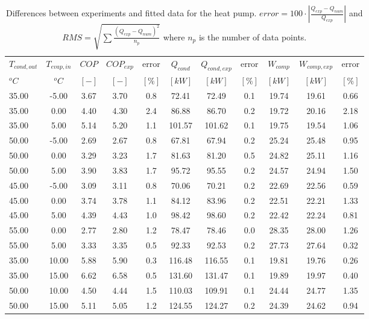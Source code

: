 \documentclass[english]{SPFShortReport}
\begin{document}
\begin{table}[!ht]
\begin{small}
\caption{Differences between experiments and fitted data for the heat pump.          $error=100 \cdot |\frac{Q_{exp}-Q_{num}}{Q_{exp}}|$ and $RMS = \sqrt { \sum{\frac{(Q_{exp}-Q_{num})^2}{n_p}} }$ where $n_p$ is the number of data points.}
\begin{center}
\resizebox{12cm}{!} 
{
\begin{tabular}{l | c c c c c c c c c c } 
\hline
\hline
$T_{cond,out}$ &$T_{evap,in}$ &$COP$ &$COP_{exp}$ &error &$Q_{cond}$ &$Q_{cond,exp}$ &error &$W_{comp}$ &$W_{comp,exp}$ &error \\ 
$^oC$ &$^oC$ &$[-]$ &$[-]$ &$[\%]$ &$[kW]$ &$[kW]$ &$[\%]$ &$[kW]$ &$[kW]$ &$[\%]$\\ 
\hline
35.00  & -5.00 & 3.67 & 3.70 & 0.8 & 72.41 & 72.49 & 0.1 & 19.74 & 19.61 & 0.66\\ 
35.00  & 0.00 & 4.40 & 4.30 & 2.4 & 86.88 & 86.70 & 0.2 & 19.72 & 20.16 & 2.18\\ 
35.00  & 5.00 & 5.14 & 5.20 & 1.1 & 101.57 & 101.62 & 0.1 & 19.75 & 19.54 & 1.06\\ 
50.00  & -5.00 & 2.69 & 2.67 & 0.8 & 67.81 & 67.94 & 0.2 & 25.24 & 25.48 & 0.95\\ 
50.00  & 0.00 & 3.29 & 3.23 & 1.7 & 81.63 & 81.20 & 0.5 & 24.82 & 25.11 & 1.16\\ 
50.00  & 5.00 & 3.90 & 3.83 & 1.7 & 95.72 & 95.55 & 0.2 & 24.57 & 24.94 & 1.50\\ 
45.00  & -5.00 & 3.09 & 3.11 & 0.8 & 70.06 & 70.21 & 0.2 & 22.69 & 22.56 & 0.59\\ 
45.00  & 0.00 & 3.74 & 3.78 & 1.1 & 84.12 & 83.96 & 0.2 & 22.51 & 22.21 & 1.33\\ 
45.00  & 5.00 & 4.39 & 4.43 & 1.0 & 98.42 & 98.60 & 0.2 & 22.42 & 22.24 & 0.81\\ 
55.00  & 0.00 & 2.77 & 2.80 & 1.2 & 78.47 & 78.46 & 0.0 & 28.35 & 28.00 & 1.26\\ 
55.00  & 5.00 & 3.33 & 3.35 & 0.5 & 92.33 & 92.53 & 0.2 & 27.73 & 27.64 & 0.32\\ 
35.00  & 10.00 & 5.88 & 5.90 & 0.3 & 116.48 & 116.55 & 0.1 & 19.81 & 19.76 & 0.26\\ 
35.00  & 15.00 & 6.62 & 6.58 & 0.5 & 131.60 & 131.47 & 0.1 & 19.89 & 19.97 & 0.40\\ 
50.00  & 10.00 & 4.50 & 4.44 & 1.5 & 110.03 & 109.91 & 0.1 & 24.44 & 24.77 & 1.35\\ 
50.00  & 15.00 & 5.11 & 5.05 & 1.2 & 124.55 & 124.27 & 0.2 & 24.39 & 24.62 & 0.94\\ 

\end{tabular}}
\end{center}
\end{small}
\end{table}
\end{document}
